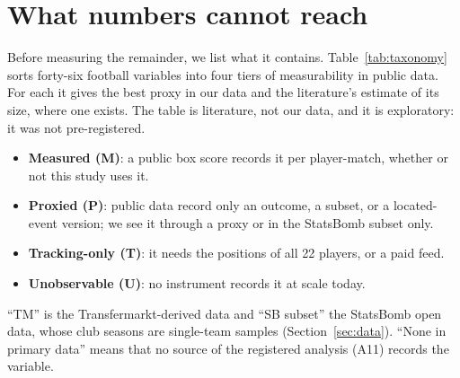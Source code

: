 \documentclass[11pt,a4paper]{article}
\begin{document}
\section{What numbers cannot reach}
\label{sec:taxonomy}

Before measuring the remainder, we list what it contains.
Table~\ref{tab:taxonomy} sorts forty-six football variables into four tiers
of measurability in public data. For each it gives the best proxy in our data
and the literature's estimate of its size, where one exists. The table is
literature, not our data, and it is exploratory: it was not pre-registered.

\begin{itemize}
  \item \textbf{Measured (M)}: a public box score records it per player-match,
    whether or not this study uses it.
  \item \textbf{Proxied (P)}: public data record only an outcome, a subset, or
    a located-event version; we see it through a proxy or in the StatsBomb
    subset only.
  \item \textbf{Tracking-only (T)}: it needs the positions of all 22 players,
    or a paid feed.
  \item \textbf{Unobservable (U)}: no instrument records it at scale today.
\end{itemize}

``TM'' is the Transfermarkt-derived data and ``SB subset'' the StatsBomb open
data, whose club seasons are single-team samples (Section~\ref{sec:data}).
``None in primary data'' means that no source of the registered analysis (A11)
records the variable.
\end{document}
